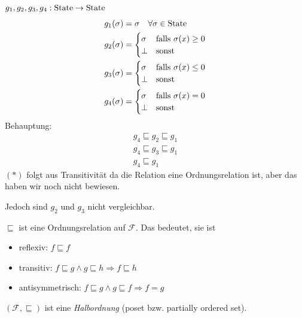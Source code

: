 \par\medskip
\begin{example}
    $g_1, g_2, g_3, g_4 : \operatorname{State} \to \operatorname{State}$
    \begin{align*}
        g_1(\sigma) & = \sigma \quad \forall \sigma \in \operatorname{State} \\
        g_2(\sigma) & = \begin{cases}
            \sigma & \text{falls } \sigma(x) \geq 0 \\
            \bot & \text{sonst} \\
        \end{cases} \\
        g_3(\sigma) & = \begin{cases}
            \sigma & \text{falls } \sigma(x) \leq 0 \\
            \bot & \text{sonst} \\
        \end{cases} \\
        g_4(\sigma) & = \begin{cases}
            \sigma & \text{falls } \sigma(x) = 0 \\
            \bot & \text{sonst} \\
        \end{cases} \\
    \end{align*}
    Behauptung:
    \begin{align*}
        g_4 \sqsubseteq g_2 \sqsubseteq g_1 \\
        g_4 \sqsubseteq g_3 \sqsubseteq g_1 \\
        g_4 \sqsubseteq g_1 \tag{*}
    \end{align*}
    $(*)$ folgt aus Transitivität da die Relation eine Ordnungsrelation ist, aber das haben wir noch nicht bewiesen.

    Jedoch sind $g_2$ und $g_3$ nicht vergleichbar.
\end{example}

\par\bigskip
\begin{remark}[Fakt]
    $\sqsubseteq$ ist eine Ordnungsrelation auf $\mathcal{F}$. Das bedeutet, sie ist
    \begin{itemize}
        \item reflexiv: $f \sqsubseteq f$
        \item transitiv: $f \sqsubseteq g \wedge g \sqsubseteq h \Rightarrow f \sqsubseteq h$
        \item antisymmetrisch: $f \sqsubseteq g \wedge g \sqsubseteq f \Rightarrow f = g$
    \end{itemize}

    $(\mathcal{F}, \sqsubseteq)$ ist eine \emph{Halbordnung} (poset bzw. partially ordered set).
\end{remark}

